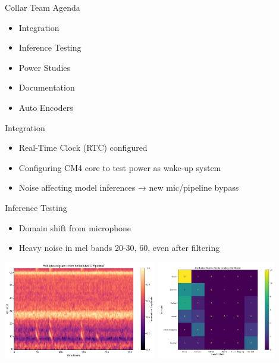 \begin{frame}{Collar Team Agenda}
    \begin{itemize}
        \item Integration
        \item Inference Testing
        \item Power Studies
        \item Documentation
        \item Auto Encoders       
    \end{itemize}
\end{frame}

\begin{frame}{Integration}
    \begin{itemize}
        \item Real-Time Clock (RTC) configured
        \item Configuring CM4 core to test power as wake-up system
        \item Noise affecting model inferences → new mic/pipeline bypass
    \end{itemize}
\end{frame}

\begin{frame}{Inference Testing}
    \begin{itemize}
        \item Domain shift from microphone 
        \item Heavy noise in mel bands 20-30, 60, even after filtering
    \end{itemize}
    \includegraphics[height=0.7\textheight,width=0.5\textwidth,keepaspectratio]{images/melSpec.png}
    \includegraphics[height=0.7\textheight,width=0.39\textwidth,keepaspectratio]{images/confusionMatrix.png}
\end{frame}

